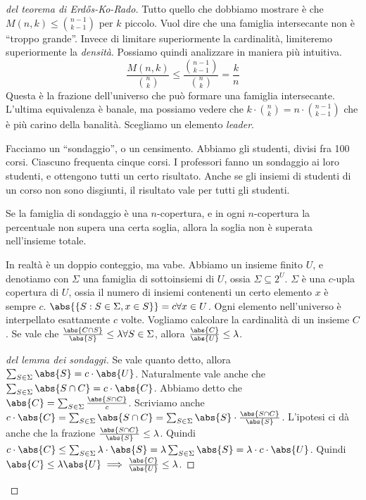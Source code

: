 \begin{proof}[del teorema di Erd\H{o}s-Ko-Rado]
	Tutto quello che dobbiamo mostrare \`e che $M(n,k) \le \binom{n-1}{k-1}$ per $k$ piccolo.
	Vuol dire che una famiglia intersecante non \`e ``troppo grande''.
	Invece di limitare superiormente la cardinalit\`a, limiteremo superiormente la \emph{densit\`a}.
	Possiamo quindi analizzare in maniera pi\`u intuitiva.
	\[
		\frac{M(n,k)}{\binom{n}{k}} \le \frac{\binom{n-1}{k-1}}{\binom{n}{k}} = \frac{k}{n}
	\]
	Questa \`e la frazione dell'universo che pu\`o formare una famiglia intersecante.
	L'ultima equivalenza \`e banale, ma possiamo vedere che $k \cdot \binom{n}{k} = n \cdot \binom{n-1}{k-1}$ che \`e pi\`u carino della banalit\`a.
	Scegliamo un elemento \emph{leader}.

	Facciamo un ``sondaggio'', o un censimento.
	Abbiamo gli studenti, divisi fra 100 corsi.
	Ciascuno frequenta cinque corsi.
	I professori fanno un sondaggio ai loro studenti, e ottengono tutti un certo risultato.
	Anche se gli insiemi di studenti di un corso non sono disgiunti, il risultato vale per tutti gli studenti.

	Se la famiglia di sondaggio \`e una $n$-copertura, e in ogni $n$-copertura la percentuale non supera una certa soglia, allora la soglia non \`e superata nell'insieme totale.

	\begin{lemma}
		In realt\`a \`e un doppio conteggio, ma vabe.
		Abbiamo un insieme finito $U$, e denotiamo con $\Sigma$ una famiglia di sottoinsiemi di $U$, ossia $\Sigma \subseteq 2^{U}$.
		$\Sigma$ \`e una $c$-upla copertura di $U$, ossia il numero di insiemi contenenti un certo elemento $x$ \`e sempre $c$.
		$\abs{\{S : S \in \Sigma, x \in S \}} = c \forall x \in U$.
		Ogni elemento nell'universo \`e interpellato esattamente $c$ volte.
		Vogliamo calcolare la cardinalit\`a di un insieme $C$.
		Se vale che $\frac{\abs{C \cap S}}{\abs{S}} \le \lambda \forall S \in \Sigma$, allora $\frac{\abs{C}}{\abs{U}} \le \lambda$.
	\end{lemma}
	\begin{proof}[del lemma dei sondaggi]
		Se vale quanto detto, allora $\sum_{S \in \Sigma} \abs{S} = c \cdot \abs{U}$.
		Naturalmente vale anche che $\sum_{S \in \Sigma} \abs{S \cap C} = c \cdot \abs{C}$.
		Abbiamo detto che $\abs{C} = \sum_{S \in \Sigma} \frac{\abs{S \cap C}}{c}$.
		Scriviamo anche $c \cdot \abs{C} = \sum_{S \in \Sigma} \abs{S \cap C} = \sum_{S \in \Sigma} \abs{S} \cdot \frac{\abs{S \cap C}}{\abs{S}}$.
		L'ipotesi ci d\`a anche che la frazione $\frac{\abs{S \cap C}}{\abs{S}} \le \lambda$.
		Quindi $c \cdot \abs{C} \le \sum_{S \in \Sigma} \lambda \cdot \abs{S} = \lambda \sum_{S \in \Sigma} \abs{S} = \lambda \cdot c \cdot \abs{U}$.
		Quindi $\abs{C} \le \lambda \abs{U} \implies \frac{\abs{C}}{\abs{U}} \le \lambda$.
	\end{proof}


\end{proof}
